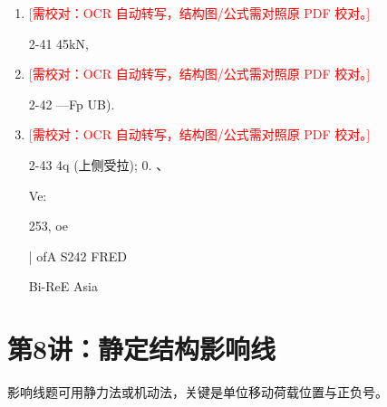 \documentclass[UTF8,12pt,a4paper,openany]{ctexbook}
\newcommand{\TODO}[1]{\textcolor{red}{[需校对：#1]}}
\begin{document}
\begin{enumerate}[label=\textbf{\arabic*.},leftmargin=2em]
\item \TODO{OCR 自动转写，结构图/公式需对照原 PDF 校对。}\par 2-41 45kN,
\item \TODO{OCR 自动转写，结构图/公式需对照原 PDF 校对。}\par 2-42 —Fp UB).
\item \TODO{OCR 自动转写，结构图/公式需对照原 PDF 校对。}\par 2-43 4q (上侧受拉); 0.                                        、\par Ve:\par 253, oe\par |                                                   ofA S242 FRED\par Bi-ReE Asia
\end{enumerate}
\chapter{第8讲：静定结构影响线}
\begin{tcolorbox}[title=解析总览]
影响线题可用静力法或机动法，关键是单位移动荷载位置与正负号。
\end{tcolorbox}
\end{document}
